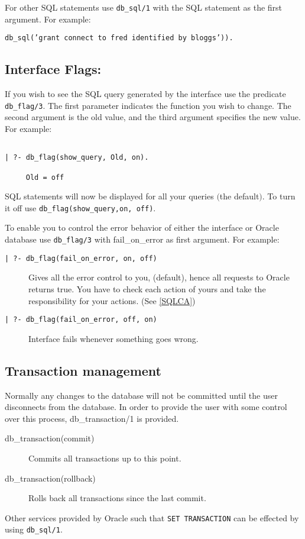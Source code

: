 For other SQL statements use {\tt db\_sql/1} with the SQL statement as the 
     first argument.  For example:
\begin{center}
{\tt db\_sql('grant connect to fred identified by bloggs')).}
\end{center}


\subsection{Interface Flags:}
	
   If you wish to see the SQL query generated by the interface use the 
predicate {\tt db\_flag/3}.  The first parameter indicates the function you wish to
change.  The second argument is the old value, and the third argument specifies
the new value.  For example:
\begin{verbatim}

| ?- db_flag(show_query, Old, on).

     Old = off
\end{verbatim}

SQL statements will now be displayed for all your queries $($the default$)$.
To turn it off use {\tt db\_flag(show\_query,on, off)}.


To enable you to control the error behavior of either the interface or
Oracle database use {\tt db\_flag/3} with fail\_on\_error as first argument.
For example:

\begin{description}

\item[\tt | ?- db\_flag(fail\_on\_error, on, off)]

     Gives all the error control to you,
     (default), hence all requests to Oracle returns true.  You have to check
     each action of yours and take the responsibility for your actions.
     (See \ref{SQLCA})

\item[\tt | ?- db\_flag(fail\_on\_error, off, on)]

	Interface fails whenever something goes wrong.
\end{description}


\subsection{Transaction management}\label{Transaction-management}


Normally any changes to the database will not be committed until the user 
disconnects from the database.  In order to provide the user with some control
over this process, db\_transaction/1 is provided. 
\begin{description}
\item[db\_transaction(commit)]
	Commits all transactions up to this point.
\item[db\_transaction(rollback)]
	Rolls back all transactions since the last commit.
\end{description}
Other services provided by Oracle such that {\tt SET TRANSACTION} can be
effected by using {\tt db\_sql/1}.

